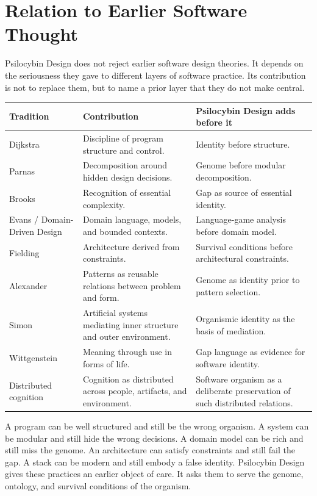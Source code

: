 \documentclass[11pt]{article}
\begin{document}
\section{Relation to Earlier Software Thought}

Psilocybin Design does not reject earlier software design theories. It depends on the seriousness they gave to different layers of software practice. Its contribution is not to replace them, but to name a prior layer that they do not make central.

\begin{longtable}{|p{}|p{}|p{}|}
\hline
\textbf{Tradition} & \textbf{Contribution} & \textbf{Psilocybin Design adds before it} \\
\hline
Dijkstra & Discipline of program structure and control. & Identity before structure. \\
\hline
Parnas & Decomposition around hidden design decisions. & Genome before modular decomposition. \\
\hline
Brooks & Recognition of essential complexity. & Gap as source of essential identity. \\
\hline
Evans / Domain-Driven Design & Domain language, models, and bounded contexts. & Language-game analysis before domain model. \\
\hline
Fielding & Architecture derived from constraints. & Survival conditions before architectural constraints. \\
\hline
Alexander & Patterns as reusable relations between problem and form. & Genome as identity prior to pattern selection. \\
\hline
Simon & Artificial systems mediating inner structure and outer environment. & Organismic identity as the basis of mediation. \\
\hline
Wittgenstein & Meaning through use in forms of life. & Gap language as evidence for software identity. \\
\hline
Distributed cognition & Cognition as distributed across people, artifacts, and environment. & Software organism as a deliberate preservation of such distributed relations. \\
\hline
\end{longtable}

A program can be well structured and still be the wrong organism. A system can be modular and still hide the wrong decisions. A domain model can be rich and still miss the genome. An architecture can satisfy constraints and still fail the gap. A stack can be modern and still embody a false identity. Psilocybin Design gives these practices an earlier object of care. It asks them to serve the genome, ontology, and survival conditions of the organism.
\end{document}
